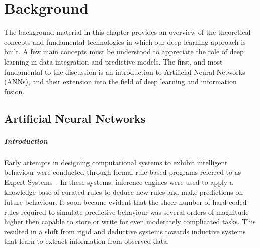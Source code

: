 \chapter{Background}\label{chap:background}

The background material in this chapter provides an overview of the theoretical concepts and fundamental technologies in which our deep learning approach is built. A few main concepts must be understood to appreciate the role of deep learning in data integration and predictive models. The first, and most fundamental to the discussion is an introduction to Artificial Neural Networks (ANNs), and their extension into the field of deep learning and information fusion. 

\section{Artificial Neural Networks}\label{sec:ann}

\paragraph{Introduction}

Early attempts in designing computational systems to exhibit intelligent behaviour were conducted through formal rule-based programs referred to as Expert Systems~\cite{weiss1991computer}. In these systems, inference engines were used to apply a knowledge base of curated rules to deduce new rules and make predictions on future behaviour. It soon became evident that the sheer number of hard-coded rules required to simulate predictive behaviour was several orders of magnitude higher then capable to store or write for even moderately complicated tasks. This resulted in a shift from rigid and deductive systems towards inductive systems that learn to extract information from observed data. 

 
